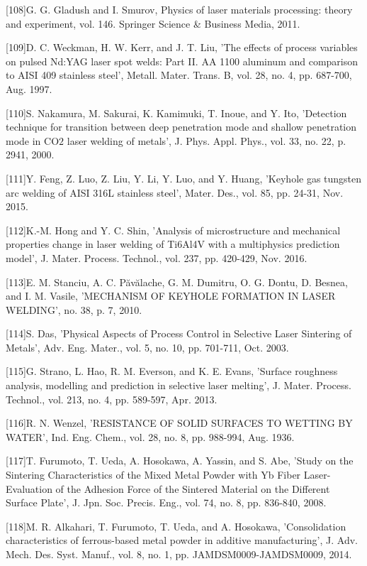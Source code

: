 \documentclass[10pt]{article}
\begin{document}
[108]G. G. Gladush and I. Smurov, Physics of laser materials processing: theory and experiment, vol. 146. Springer Science \& Business Media, 2011.

[109]D. C. Weckman, H. W. Kerr, and J. T. Liu, 'The effects of process variables on pulsed Nd:YAG laser spot welds: Part II. AA 1100 aluminum and comparison to AISI 409 stainless steel', Metall. Mater. Trans. B, vol. 28, no. 4, pp. 687-700, Aug. 1997.

[110]S. Nakamura, M. Sakurai, K. Kamimuki, T. Inoue, and Y. Ito, 'Detection technique for transition between deep penetration mode and shallow penetration mode in $\mathrm{CO} 2$ laser welding of metals', J. Phys. Appl. Phys., vol. 33, no. 22, p. 2941, 2000.

[111]Y. Feng, Z. Luo, Z. Liu, Y. Li, Y. Luo, and Y. Huang, 'Keyhole gas tungsten arc welding of AISI 316L stainless steel', Mater. Des., vol. 85, pp. 24-31, Nov. 2015.

[112]K.-M. Hong and Y. C. Shin, 'Analysis of microstructure and mechanical properties change in laser welding of Ti6Al4V with a multiphysics prediction model', J. Mater. Process. Technol., vol. 237, pp. 420-429, Nov. 2016.

[113]E. M. Stanciu, A. C. Păvălache, G. M. Dumitru, O. G. Dontu, D. Besnea, and I. M. Vasile, 'MECHANISM OF KEYHOLE FORMATION IN LASER WELDING', no. 38, p. 7, 2010.

[114]S. Das, 'Physical Aspects of Process Control in Selective Laser Sintering of Metals', Adv. Eng. Mater., vol. 5, no. 10, pp. 701-711, Oct. 2003.

[115]G. Strano, L. Hao, R. M. Everson, and K. E. Evans, 'Surface roughness analysis, modelling and prediction in selective laser melting', J. Mater. Process. Technol., vol. 213, no. 4, pp. 589-597, Apr. 2013.

[116]R. N. Wenzel, 'RESISTANCE OF SOLID SURFACES TO WETTING BY WATER', Ind. Eng. Chem., vol. 28, no. 8, pp. 988-994, Aug. 1936.

[117]T. Furumoto, T. Ueda, A. Hosokawa, A. Yassin, and S. Abe, 'Study on the Sintering Characteristics of the Mixed Metal Powder with Yb Fiber Laser- Evaluation of the Adhesion Force of the Sintered Material on the Different Surface Plate', J. Jpn. Soc. Precis. Eng., vol. 74, no. 8, pp. 836-840, 2008.

[118]M. R. Alkahari, T. Furumoto, T. Ueda, and A. Hosokawa, 'Consolidation characteristics of ferrous-based metal powder in additive manufacturing', J. Adv. Mech. Des. Syst. Manuf., vol. 8, no. 1, pp. JAMDSM0009-JAMDSM0009, 2014.
\end{document}
